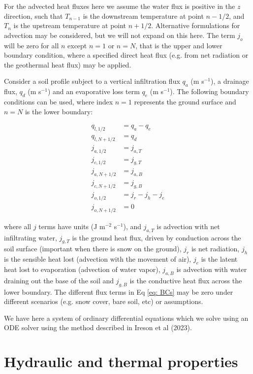 \documentclass[10pt,a4paper]{article}
\begin{document}
For the advected heat fluxes here we assume the water flux is positive in the $z$ direction, such that $T_{n-1}$ is the downstream temperature at point $n-1/2$, and $T_n$ is the upstream temperature at point $n+1/2$. Alternative formulations for advection may be considered, but we will not expand on this here.  The term $j_o$ will be zero for all $n$ except $n=1$ or $n=N$, that is the upper and lower boundary condition, where a specified direct heat flux (e.g. from net radiation or the geothermal heat flux) may be applied.

Consider a soil profile subject to a vertical infiltration flux $q_a$ (m s$^{-1}$), a drainage flux, $q_d$ (m s$^{-1}$) and an evaporative loss term $q_e$ (m s$^{-1}$). The following boundary conditions can be used, where index $n=1$ represents the ground surface and $n=N$ is the lower boundary: 

\begin{equation} \label{eq: BCs}
	\begin{array}{rl}
q_{l,1/2}& =q_a-q_e
\\
q_{l,N+1/2}& =q_d
\\
j_{a,1/2}& =j_{a,T}
\\
j_{c,1/2}& =j_{g,T}
\\
j_{a,N+1/2}& =j_{a,B}
\\
j_{c,N+1/2}& =j_{g,B}
\\
j_{o,1/2}& =j_r-j_h-j_e
\\
j_{o,N+1/2}& =0
	\end{array}
\end{equation}

where all $j$ terms have units (J m$^{-2}$ s$^{-1}$), and $j_{a,T}$ is advection with net infiltrating water, $j_{g,T}$ is the ground heat flux, driven by conduction across the soil surface (important when there is snow on the ground), $j_r$ is net radiation, $j_h$ is the sensible heat lost (advection with the movement of air), $j_e$ is the latent heat lost to evaporation (advection of water vapor),  $j_{a,B}$ is advection with water draining out the base of the soil and $j_{g,B}$ is the conductive heat flux across the lower boundary. The different flux terms in Eq \ref{eq: BCs} may be zero under different scenarios (e.g. snow cover, bare soil, etc) or assumptions. 

We have here a system of ordinary differential equations which we solve using an ODE solver using the method described in Ireson et al (2023).



\section{Hydraulic and thermal properties}
\end{document}
